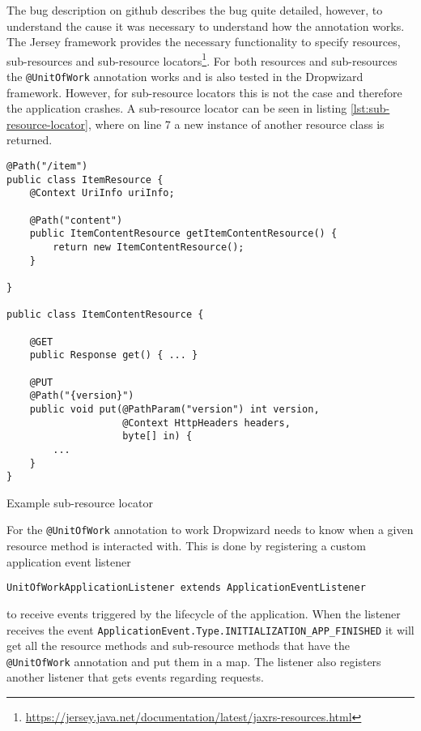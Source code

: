 \documentclass[11pt]{article}
\begin{document}
The bug description on github describes the bug quite detailed, however, to understand the cause it was necessary to understand how the annotation works. The Jersey framework provides the necessary functionality to specify resources, sub-resources and sub-resource locators\footnote{\url{https://jersey.java.net/documentation/latest/jaxrs-resources.html}}. For both resources and sub-resources the \texttt{@UnitOfWork} annotation works and is also tested in the Dropwizard framework. However, for sub-resource locators this is not the case and therefore the application crashes. A sub-resource locator can be seen in listing \ref{lst:sub-resource-locator}, where on line 7 a new instance of another resource class is returned.

\begin{listing}
\begin{verbatim}
@Path("/item")
public class ItemResource {
    @Context UriInfo uriInfo;

    @Path("content")
    public ItemContentResource getItemContentResource() {
        return new ItemContentResource();
    }

}

public class ItemContentResource {

    @GET
    public Response get() { ... }

    @PUT
    @Path("{version}")
    public void put(@PathParam("version") int version,
                    @Context HttpHeaders headers,
                    byte[] in) {
        ...
    }
}
\end{verbatim}
\caption{Example sub-resource locator}
\label{lst:sub-resource-locator}
\end{listing}

For the \texttt{@UnitOfWork} annotation to work Dropwizard needs to know when a given resource method is interacted with. This is done by registering a custom application event listener

\begin{verbatim}
UnitOfWorkApplicationListener extends ApplicationEventListener
\end{verbatim}

to receive events triggered by the lifecycle of the application. When the listener receives the event \texttt{ApplicationEvent.Type.INITIALIZATION_APP_FINISHED} it will get all the resource methods and sub-resource methods that have the \texttt{@UnitOfWork} annotation and put them in a map. The listener also registers another listener that gets events regarding requests.
\end{document}
